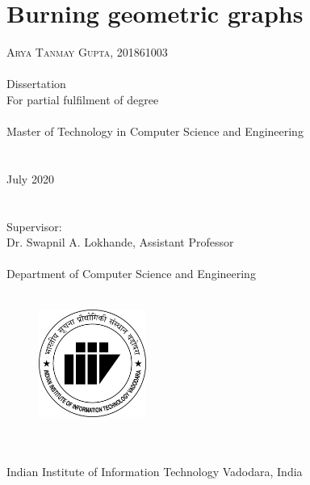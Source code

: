\chapter*{\centering Burning geometric graphs\\}

\large{\centering \textsc{Arya Tanmay Gupta}, 201861003\\~\\}
\large{\centering Dissertation\\For partial fulfilment of degree\\~\\}
\large{\centering Master of Technology in Computer Science and Engineering\\~\\~\\}
\large{\centering July 2020\\~\\~\\}
\large{\centering Supervisor:\\}
\large{\centering Dr. Swapnil A. Lokhande, Assistant Professor\\~\\}
\large{\centering Department of Computer Science and Engineering\\~\\}
\begin{figure}[h]
    \centering
    \includegraphics[width=100pt]{000-ogol.jpg}\\~\\~\\
\end{figure}
{\Large{\centering Indian Institute of Information Technology Vadodara, India\\}}
\thispagestyle{empty}%